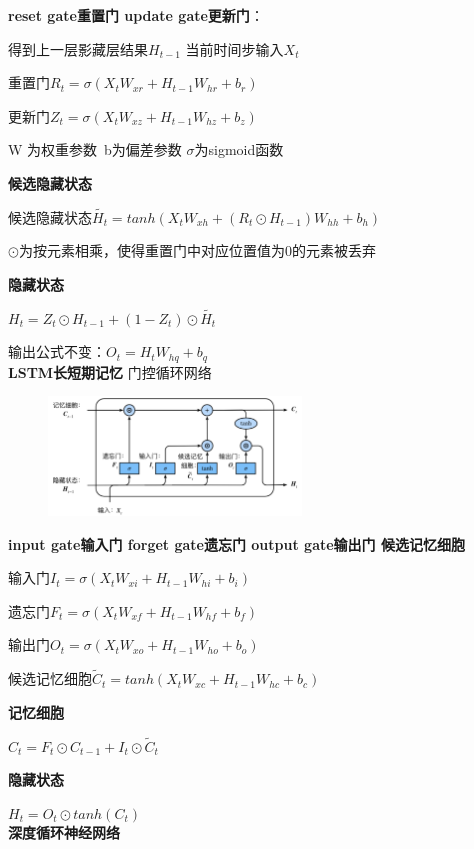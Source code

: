 \documentclass[UTF8]{ctexart}
\begin{document}
  \textbf{reset gate重置门 update gate更新门}：

  \quad 得到上一层影藏层结果$H_{t-1}$ 当前时间步输入$X_t$

  \quad 重置门$R_t = \sigma(X_tW_{xr} + H_{t-1}W_{hr} + b_r)$
  
  \quad 更新门$Z_t = \sigma(X_tW_{xz} + H_{t-1}W_{hz} + b_z)$

  \quad \quad W 为权重参数\ b为偏差参数 $\sigma$为sigmoid函数

  \textbf{候选隐藏状态}

  \quad 候选隐藏状态$\tilde{H_t} = tanh(X_tW_{xh} + (R_t \odot  H_{t-1})W_{hh} + b_h)$

  \quad \quad $\odot$为按元素相乘，使得重置门中对应位置值为0的元素被丢弃

  \textbf{隐藏状态}

  \quad $H_t = Z_t \odot H_{t-1} + (1-Z_t)\odot \tilde{H_t}$
  
  输出公式不变：$O_t = H_tW_{hq} + b_q$\\
\textbf{LSTM长短期记忆} 门控循环网络
  \begin{figure}[H] %
    \centering %
    \includegraphics[width=0.6\textwidth]{note_images/LSTM.png} %
  \end{figure}
  
  \textbf{input gate输入门 forget gate遗忘门 output gate输出门 候选记忆细胞}

  \quad 输入门$I_t = \sigma(X_tW_{xi} + H_{t-1}W_{hi} + b_i)$

  \quad 遗忘门$F_t = \sigma(X_tW_{xf} + H_{t-1}W_{hf} + b_f)$
  
  \quad 输出门$O_t = \sigma(X_tW_{xo} + H_{t-1}W_{ho} + b_o)$

  \quad 候选记忆细胞$\tilde{C}_t = tanh(X_tW_{xc} + H_{t-1}W_{hc} + b_c) $

  \textbf{记忆细胞}

  \quad $C_t = F_t \odot C_{t-1} + I_t \odot \tilde{C}_t$

  \textbf{隐藏状态}

  \quad $H_t = O_t \odot tanh(C_t)$\\
\textbf{深度循环神经网络}
\end{document}
